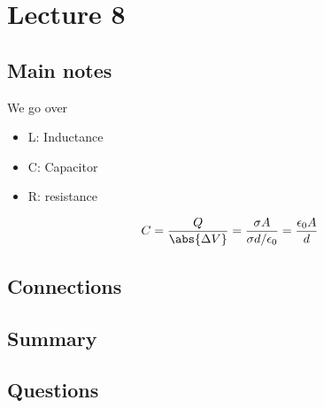 \section{Lecture 8}

\subsection{Main notes}

We go over
\begin{itemize}
	\item L: Inductance
  \item C: Capacitor
  \item R: resistance
\end{itemize}

\[
C = \frac{Q}{\abs{\Delta V}} = \frac{\sigma A}{\sigma d / \epsilon_0} = \frac{\epsilon_0 A}{d}
  \]

\subsection{Connections}


\subsection{Summary}


\subsection{Questions}
